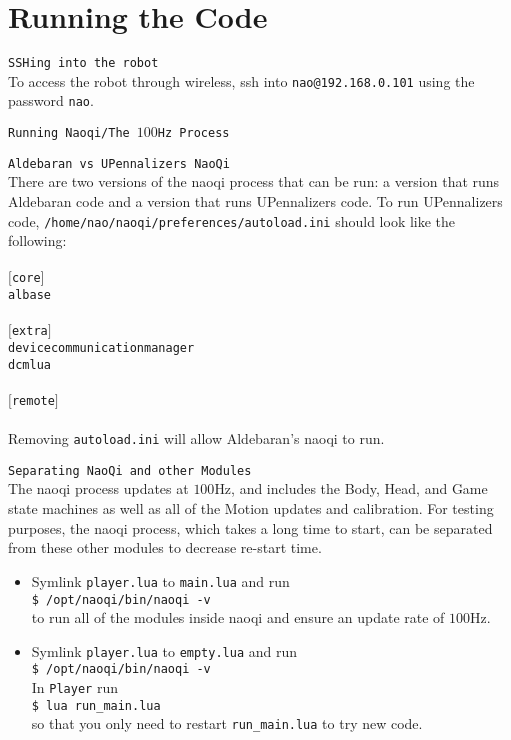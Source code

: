 \documentclass{article}
\begin{document}
\section{Running the Code}

  \begin{description}

    \item \texttt{SSHing into the robot}\\
    To access the robot through wireless, ssh into \texttt{nao@192.168.0.101} using the password \texttt{nao}.

    \item \texttt{Running Naoqi/The $100$Hz Process}
    \begin{description}
      
      \item \texttt{Aldebaran vs UPennalizers NaoQi}\\
      There are two versions of the naoqi process that can be run: a version that runs Aldebaran code and a version that runs UPennalizers code.  To run UPennalizers code, \texttt{/home/nao/naoqi/preferences/autoload.ini} should look like the following:\\\\
      \texttt{$[$core$]$\\albase\\\\$[$extra$]$\\devicecommunicationmanager\\dcmlua\\\\$[$remote$]$}\\\\
      Removing \texttt{autoload.ini} will allow Aldebaran's naoqi to run.  \\
      
      \item \texttt{Separating NaoQi and other Modules}\\
      The naoqi process updates at $100$Hz, and includes the Body, Head, and Game state machines as well as all of the Motion updates and calibration.  For testing purposes, the naoqi process, which takes a long time to start, can be separated from these other modules to decrease re-start time.
      \begin{itemize}
        \item Symlink \texttt{player.lua} to \texttt{main.lua} and run\\
        \texttt{\$ /opt/naoqi/bin/naoqi -v}\\
        to run all of the modules inside naoqi and ensure an update rate of $100$Hz.\\
        \item Symlink \texttt{player.lua} to \texttt{empty.lua} and run\\
        \texttt{\$ /opt/naoqi/bin/naoqi -v}\\
        In \texttt{Player} run\\
        \texttt{\$ lua run\_main.lua}\\
        so that you only need to restart \texttt{run\_main.lua} to try new code.  
      \end{itemize}
    

\end{description}
\end{description}
\end{document}
